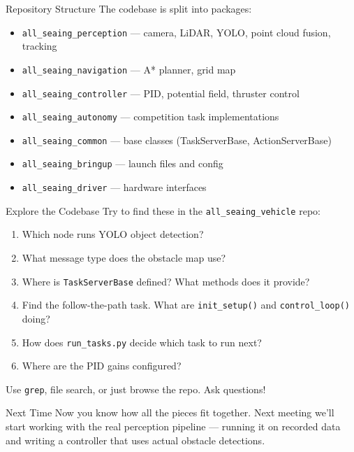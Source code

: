 \documentclass[aspectratio=169]{beamer}
\begin{document}
\begin{frame}{Repository Structure}
    The codebase is split into packages:
    \vfill
    \begin{itemize}
        \item \texttt{all\_seaing\_perception} --- camera, LiDAR, YOLO, point cloud fusion, tracking
        \item \texttt{all\_seaing\_navigation} --- A* planner, grid map
        \item \texttt{all\_seaing\_controller} --- PID, potential field, thruster control
        \item \texttt{all\_seaing\_autonomy} --- competition task implementations
        \item \texttt{all\_seaing\_common} --- base classes (TaskServerBase, ActionServerBase)
        \item \texttt{all\_seaing\_bringup} --- launch files and config
        \item \texttt{all\_seaing\_driver} --- hardware interfaces
    \end{itemize}
\end{frame}

\begin{frame}{Explore the Codebase}
    Try to find these in the \texttt{all\_seaing\_vehicle} repo:
    \vfill
    \begin{enumerate}
        \item Which node runs YOLO object detection?
        \item What message type does the obstacle map use?
        \item Where is \texttt{TaskServerBase} defined? What methods does it provide?
        \item Find the follow-the-path task. What are \texttt{init\_setup()} and \texttt{control\_loop()} doing?
        \item How does \texttt{run\_tasks.py} decide which task to run next?
        \item Where are the PID gains configured?
    \end{enumerate}
    \vfill
    Use \texttt{grep}, file search, or just browse the repo. Ask questions!
\end{frame}

\begin{frame}{Next Time}
    Now you know how all the pieces fit together.
    \vfill
    Next meeting we'll start working with the real perception pipeline --- running it on recorded data and writing a controller that uses actual obstacle detections.
\end{frame}
\end{document}
